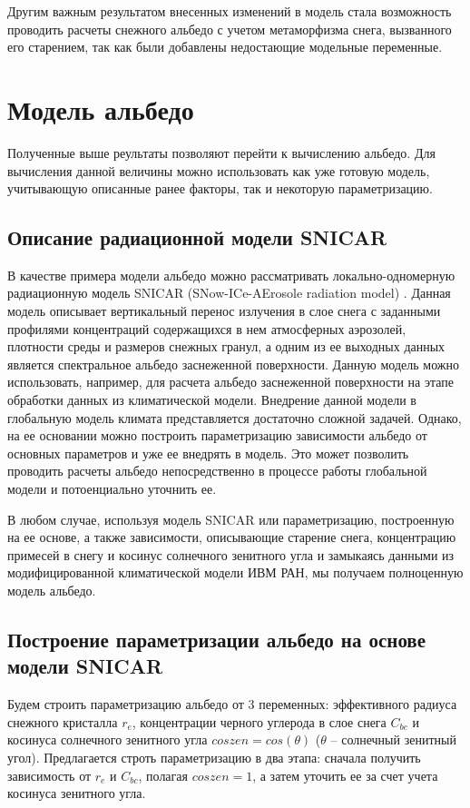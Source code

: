 \documentclass[a4paper, fontsize=14pt]{scrartcl}
\begin{document}
Другим важным результатом внесенных изменений в модель стала возможность проводить расчеты снежного альбедо с учетом метаморфизма снега, вызванного его старением, так как были добавлены недостающие модельные переменные.


\newpage
\section{Модель альбедо}

Полученные выше реультаты позволяют перейти к вычислению альбедо. Для вычисления данной величины можно использовать как уже готовую модель, учитывающую описанные ранее факторы, так и некоторую параметризацию. 

\subsection{Описание радиационной модели SNICAR}
В качестве примера модели альбедо можно рассматривать локально-одномерную радиационную модель SNICAR (SNow-ICe-AErosole radiation model) \cite{Flanner2007}. Данная модель описывает вертикальный перенос излучения в слое снега с заданными профилями концентраций содержащихся в нем атмосферных аэрозолей, плотности среды и размеров снежных гранул, а одним из ее выходных данных является спектральное альбедо заснеженной поверхности. Данную модель можно использовать, например, для расчета альбедо заснеженной поверхности на этапе обработки данных из климатической модели. Внедрение данной модели в глобальную модель климата представляется достаточно сложной задачей. Однако, на ее основании можно построить параметризацию зависимости альбедо от основных параметров и уже ее внедрять в модель. Это может позволить проводить расчеты альбедо непосредственно в процессе работы глобальной модели и потоенциально уточнить ее.

В любом случае, используя модель SNICAR или параметризацию, построенную на ее основе, а также зависимости, описывающие старение снега, концентрацию примесей в снегу и косинус солнечного зенитного угла и замыкаясь данными из модифицированной климатической модели ИВМ РАН, мы получаем полноценную модель альбедо.

\subsection{Построение параметризации альбедо на основе модели SNICAR}

Будем строить параметризацию альбедо от 3 переменных: эффективного радиуса снежного кристалла $r_e$, концентрации черного углерода в слое снега $C_{bc}$ и косинуса солнечного зенитного угла $coszen = cos(\theta)$ ($\theta$ -- солнечный зенитный угол). Предлагается строть параметризацию в два этапа: сначала получить зависимость от $r_e$ и $C_{bc}$, полагая $coszen = 1$, а затем уточить ее за счет учета косинуса зенитного угла.
\end{document}
